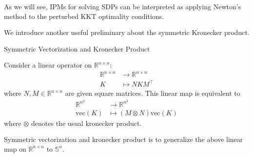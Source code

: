 \documentclass[
]{book}
\theoremstyle{definition}
\theoremstyle{definition}
\theoremstyle{definition}
\theoremstyle{definition}
\theoremstyle{remark}
\begin{document}
As we will see, IPMs for solving SDPs can be interpreted as applying Newton's method to the perturbed KKT optimality conditions.

We introduce another useful preliminary about the symmetric Kronecker product.

Symmetric Vectorization and Kronecker Product

Consider a linear operator on \(\mathbb{R}^{n \times n}\):
\begin{equation}
\begin{split}
\mathbb{R}^{n \times n} & \rightarrow \mathbb{R}^{n \times n} \\
K & \mapsto N K M^\top
\end{split}
\label{eq:linear-opt-Rn}
\end{equation}
where \(N,M \in \mathbb{R}^{n \times n}\) are given square matrices. This linear map is equivalent to
\begin{equation}
\begin{split}
\mathbb{R}^{n^2} & \rightarrow \mathbb{R}^{n^2} \\
\mathrm{vec}(K) & \mapsto (M \otimes N) \mathrm{vec}(K)
\end{split}
\label{eq:linear-opt-Rn-kron}
\end{equation}
where \(\otimes\) denotes the usual kronecker product.

Symmetric vectorization and kronecker product is to generalize the above linear map on \(\mathbb{R}^{n \times n}\) to \(\mathbb{S}^{n}\).
\end{document}
